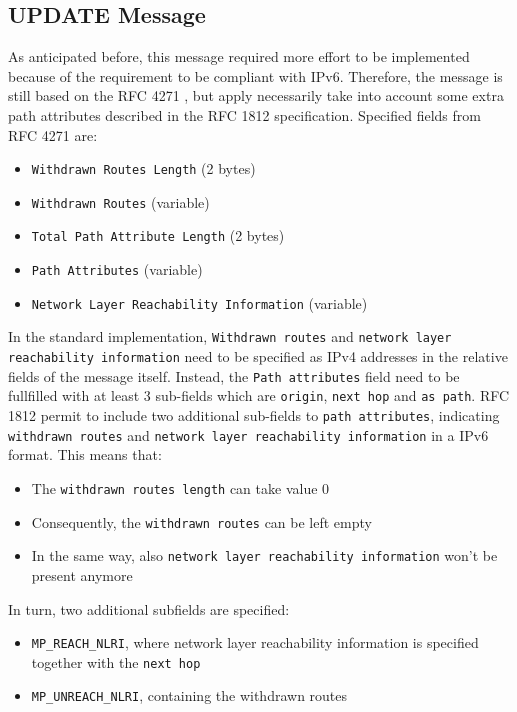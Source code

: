 \subsection{UPDATE Message}
As anticipated before, this message required more effort to be implemented because of the requirement to be compliant with IPv6.
Therefore, the message is still based on the RFC 4271 \cite{rfc4271}, but apply necessarily take into account some extra path attributes described in the RFC 1812 \cite{rfc1812} specification.
Specified fields from RFC 4271 are:
\begin{itemize}
    \item \texttt{Withdrawn Routes Length} (2 bytes)
    \item \texttt{Withdrawn Routes} (variable)
    \item \texttt{Total Path Attribute Length} (2 bytes)
    \item \texttt{Path Attributes} (variable)
    \item \texttt{Network Layer Reachability Information} (variable)
\end{itemize}
In the standard implementation, \texttt{Withdrawn routes} and \texttt{network layer reachability information} need to be specified as IPv4 addresses in the relative fields of the message itself. Instead, the \texttt{Path attributes} field need to be fullfilled with at least 3 sub-fields which are \texttt{origin}, \texttt{next hop} and \texttt{as path}.
RFC 1812 permit to include two additional sub-fields to \texttt{path attributes}, indicating \texttt{withdrawn routes} and \texttt{network layer reachability information} in a IPv6 format.
This means that:
\begin{itemize}
    \item The \texttt{withdrawn routes length} can take value 0
    \item Consequently, the \texttt{withdrawn routes} can be left empty
    \item In the same way, also \texttt{network layer reachability information} won't be present anymore
\end{itemize}
In turn, two additional subfields are specified:
\begin{itemize}
    \item \texttt{MP\_REACH\_NLRI}, where network layer reachability information is specified together with the \texttt{next hop}
    \item \texttt{MP\_UNREACH\_NLRI}, containing the withdrawn routes
\end{itemize}

